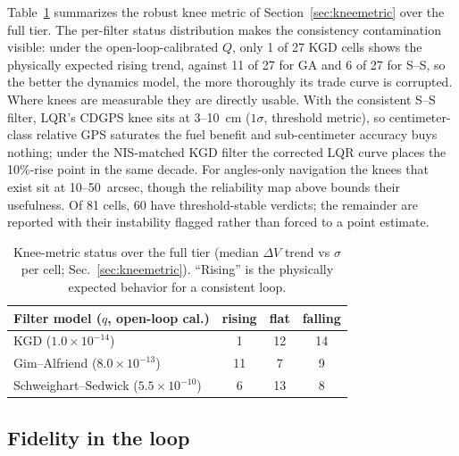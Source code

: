Table~\ref{tab:knees} summarizes the robust knee metric of
Section~\ref{sec:kneemetric} over the full tier. The per-filter status
distribution makes the consistency contamination visible: under the
open-loop-calibrated $Q$, only 1 of 27 KGD cells shows the physically
expected rising trend, against 11 of 27 for GA and 6 of 27 for S--S, so the
better the dynamics model, the more thoroughly its trade curve is corrupted.
Where knees are measurable they are directly usable. With the consistent
S--S filter, LQR's CDGPS knee sits at 3--10~cm ($1\sigma$, threshold
metric), so centimeter-class relative GPS saturates the fuel benefit and
sub-centimeter accuracy buys nothing; under the NIS-matched KGD filter the
corrected LQR curve places the 10\%-rise point in the same decade. For
angles-only navigation the knees that exist sit at 10--50~arcsec, though the
reliability map above bounds their usefulness. Of 81 cells, 60 have
threshold-stable verdicts; the remainder are reported with their instability
flagged rather than forced to a point estimate.

\begin{table}[t]
  \centering
  \caption{Knee-metric status over the full tier (median $\Delta V$ trend
  vs $\sigma$ per cell; Sec.~\ref{sec:kneemetric}). ``Rising'' is the
  physically expected behavior for a consistent loop.}
  \label{tab:knees}
  \begin{tabular}{lccc}
    \toprule
    Filter model ($q$, open-loop cal.) & rising & flat & falling \\
    \midrule
    KGD ($1.0\times10^{-14}$) & 1 & 12 & 14 \\
    Gim--Alfriend ($8.0\times10^{-13}$) & 11 & 7 & 9 \\
    Schweighart--Sedwick ($5.5\times10^{-10}$) & 6 & 13 & 8 \\
    \bottomrule
  \end{tabular}
\end{table}

\subsection{Fidelity in the loop}

